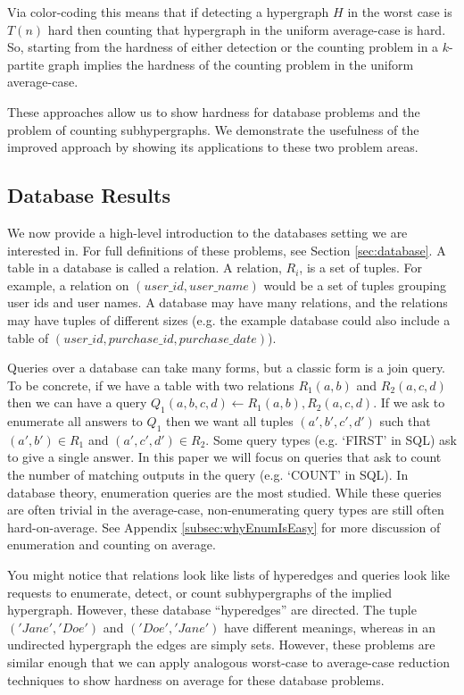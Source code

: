 \documentclass[11pt,letterpaper,pdftex]{article}
\newcounter{definition}
\begin{document}
Via color-coding this means that if detecting a hypergraph $H$ in the worst case is $T(n)$ hard then counting that hypergraph in the uniform average-case is hard. So, starting from the hardness of either detection or the counting problem in a $k$-partite graph implies the hardness of the counting problem in the uniform average-case. 

These approaches allow us to show hardness for database problems and the problem of counting subhypergraphs. We demonstrate the usefulness of the improved approach by showing its applications to these two problem areas.

\subsection{Database Results}
We now provide a high-level introduction to the databases setting we are interested in. For full definitions of these problems, see Section \ref{sec:database}. 
A table in a database is called a relation. 
A relation, $R_i$, is a set of tuples. 
For example, a relation on $(user\_id, user\_name)$ would be a set of tuples grouping user ids and user names. 
A database may have many relations, and the relations may have tuples of different sizes (e.g. the example database could also include a table of $(user\_id, purchase\_id, purchase\_date)$). 

Queries over a database can take many forms, but a classic form is a join query. 
To be concrete, if we have a table with two relations $R_1(a,b)$ and $R_2(a,c,d)$ then we can have a query $Q_1(a,b,c,d) \leftarrow R_1(a,b), R_2(a,c,d)$. 
If we ask to enumerate all answers to $Q_1$ then we want all tuples $(a',b',c',d')$ such that $(a',b') \in R_1$ and $(a',c',d')\in R_2$. 
Some query types (e.g. `FIRST' in SQL) ask to give a single answer. 
In this paper we will focus on queries that ask to count the number of matching outputs in the query (e.g. `COUNT' in SQL). 
In database theory, enumeration queries are the most studied.
While these queries are often trivial in the average-case, non-enumerating query types are still often hard-on-average.
See Appendix \ref{subsec:whyEnumIsEasy} for more discussion of enumeration and counting on average. 

You might notice that relations look like lists of hyperedges and queries look like requests to enumerate, detect, or count subhypergraphs of the implied hypergraph. 
However, these database ``hyperedges'' are directed. 
The tuple $('Jane', 'Doe')$ and $('Doe', 'Jane')$ have different meanings, whereas in an undirected hypergraph the edges are simply sets. 
However, these problems are similar enough that we can apply analogous worst-case to average-case reduction techniques to show hardness on average for these database problems. 
\end{document}
